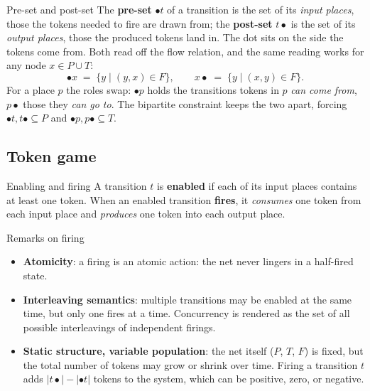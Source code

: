 \begin{definitionbox}{Pre-set and post-set}
The \textbf{pre-set} $\bullet t$ of a transition is the set of its \emph{input places}, those the tokens needed to fire are drawn from; the \textbf{post-set} $t \bullet$ is the set of its \emph{output places}, those the produced tokens land in. The dot sits on the side the tokens come from. Both read off the flow relation, and the same reading works for any node $x \in P \cup T$:
\[
  \bullet x \;=\; \{ y \mid (y,x) \in F \}, \qquad x \bullet \;=\; \{ y \mid (x,y) \in F \}.
\]
For a place $p$ the roles swap: $\bullet p$ holds the transitions tokens in $p$ \emph{can come from}, $p \bullet$ those they \emph{can go to}. The bipartite constraint keeps the two apart, forcing $\bullet t, t \bullet \subseteq P$ and $\bullet p, p \bullet \subseteq T$.
\end{definitionbox}

\subsection{Token game}

\begin{definitionbox}{Enabling and firing}
A transition $t$ is \textbf{enabled} if each of its input places contains at least one token. When an enabled transition \textbf{fires}, it \emph{consumes} one token from each input place and \emph{produces} one token into each output place.
\end{definitionbox}

\begin{notebox}{Remarks on firing}
\begin{itemize}
  \item \textbf{Atomicity}: a firing is an atomic action: the net never lingers in a half-fired state.
  \item \textbf{Interleaving semantics}: multiple transitions may be enabled at the same time, but only one fires at a time. Concurrency is rendered as the set of all possible interleavings of independent firings.
  \item \textbf{Static structure, variable population}: the net itself ($P$, $T$, $F$) is fixed, but the total number of tokens may grow or shrink over time. Firing a transition $t$ adds $|t\bullet| - |\bullet t|$ tokens to the system, which can be positive, zero, or negative.
\end{itemize}
\end{notebox}

